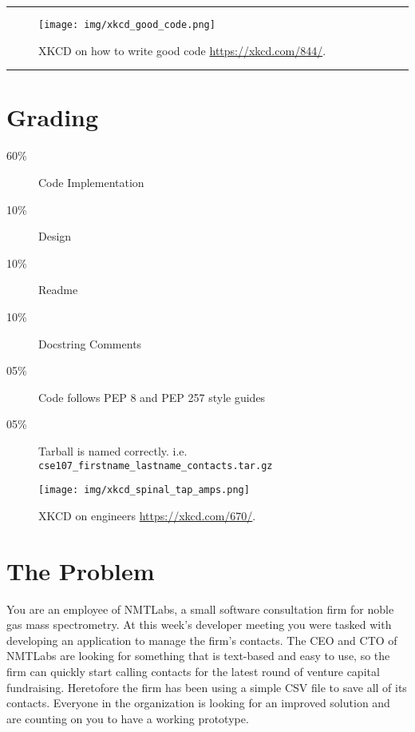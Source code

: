 \documentclass[11pt]{cselabheader}
\title{\thetitle}
\author{\theauthor}
\date{NMT Department of Computer Science and Engineering}
\begin{document}
\maketitle
\hrule

\begin{figure}[H]
\centering
\texttt{[image: img/xkcd\_good\_code.png]}
\caption{XKCD on how to write good code \url{https://xkcd.com/844/}.}
\end{figure}

\hrule

\pagebreak

\setcounter{tocdepth}{2}
\tableofcontents

\section*{Grading}
\begin{description}
\item[60\%] Code Implementation
\item[10\%] Design
\item[10\%] Readme
\item[10\%] Docstring Comments
\item[05\%] Code follows PEP 8 and PEP 257 style guides
\item[05\%] Tarball is named correctly. i.e. \texttt{cse107\_firstname\_lastname\_contacts.tar.gz}
\end{description}

\begin{center}
\begin{figure}[H]
\texttt{[image: img/xkcd\_spinal\_tap\_amps.png]}
\caption{XKCD on engineers \url{https://xkcd.com/670/}.}
\end{figure}
\end{center}

\pagebreak
{}

\section{The Problem}

You are an employee of NMTLabs, a small software consultation firm for
noble gas mass spectrometry. At this week's developer meeting
you were tasked with developing an application to manage the firm's
contacts. The CEO and CTO of NMTLabs are looking for something that is
text-based and easy to use, so the firm can quickly start calling
contacts for the latest round of venture capital fundraising.
Heretofore the firm has been using a simple CSV file to save all of
its contacts.  Everyone in the organization is looking for an improved
solution and are counting on you to have a working prototype.
\end{document}
